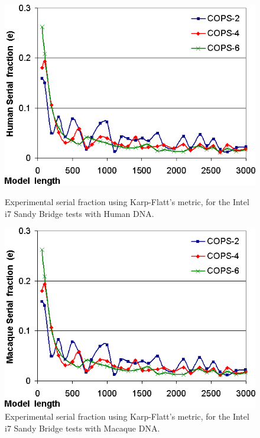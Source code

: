 \begin{figure}[h!]
    \begin{minipage}{0.48\linewidth}
		\centering
		\includegraphics[scale=0.48]{graphics/karp-flatt-larissa-human.png}
		\caption[Serial fraction on Intel i7 Sandy Bridge, Human] {Experimental serial fraction using Karp-Flatt's metric, for the Intel i7 Sandy Bridge tests with Human DNA.}
		\label{karp-flatt-larissa-human}
    \end{minipage}
    \hspace{0.04\linewidth}
    \begin{minipage}{0.48\linewidth}
		\centering
		\includegraphics[scale=0.48]{graphics/karp-flatt-larissa-macaque.png}
		\caption[Serial fraction on Intel i7 Sandy Bridge, Macaque] {Experimental serial fraction using Karp-Flatt's metric, for the Intel i7 Sandy Bridge tests with Macaque DNA.}
		\label{karp-flatt-larissa-macaque}
	\end{minipage}
\end{figure} 

